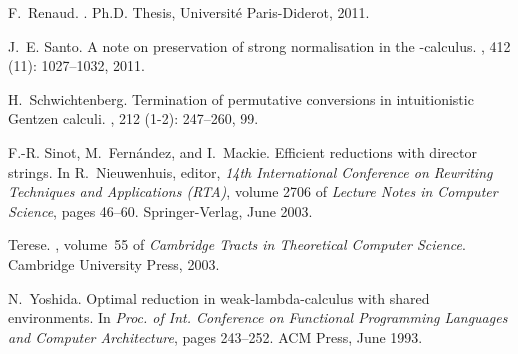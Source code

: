 \documentclass{LMCS}
\renewcommand{\>}{\rightarrow}
\begin{document}
\begin{thebibliography}{10}
F.~Renaud.
.
\newblock Ph.{D}. {T}hesis, {U}niversit\'e {P}aris-{D}iderot, 2011.

J.~E. Santo.
\newblock A note on preservation of strong normalisation in the -calculus.
, 412 (11): 1027--1032,
  2011.

H.~Schwichtenberg.
\newblock Termination of permutative conversions in intuitionistic {G}entzen
  calculi.
, 212 (1-2):
  247--260, 99.

F.-R. Sinot, M.~Fern{\'a}ndez, and I.~Mackie.
\newblock Efficient reductions with director strings.
\newblock In R.~Nieuwenhuis, editor, {\em 14th International Conference on
  Rewriting Techniques and Applications (RTA)}, volume 2706 of {\em Lecture
  Notes in Computer Science}, pages 46--60. Springer-Verlag, June 2003.

Terese.
, volume~55 of {\em Cambridge Tracts in
  Theoretical Computer Science}.
\newblock Cambridge University Press, 2003.

N.~Yoshida.
\newblock Optimal reduction in weak-lambda-calculus with shared environments.
\newblock In {\em Proc. of Int. Conference on Functional Programming Languages
  and Computer Architecture}, pages 243--252. ACM Press, June 1993.

\end{thebibliography}
\end{document}
